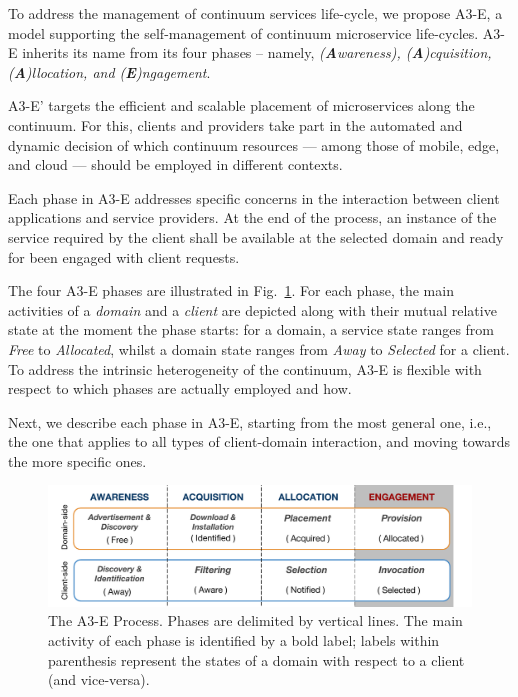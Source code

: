 To address the management of continuum services life-cycle, we propose A3-E, a model supporting the self-management of continuum microservice life-cycles. A3-E inherits its name from its four phases -- namely, \textit{(\textbf{A}wareness), (\textbf{A})cquisition, (\textbf{A})llocation, and (\textbf{E})ngagement}. 

A3-E' targets the efficient and scalable placement of microservices along the continuum. For this, clients and providers take part in the automated and dynamic decision of which continuum resources --- among those of mobile, edge, and cloud --- should be employed in different contexts.

Each phase in A3-E addresses specific concerns in the interaction between client applications and service providers. At the end of the process, an instance of the service required by the client shall be available at the selected domain and ready for been engaged with client requests. 

The four A3-E phases are illustrated in Fig.~\ref{fig:A3-E-process}. For each phase, the main activities of a \textit{domain} and a \textit{client} are depicted along with their mutual relative state at the moment the phase starts: for a domain, a service state ranges from \textit{Free} to \textit{Allocated}, whilst a domain state ranges from \textit{Away} to \textit{Selected} for a client. To address the intrinsic heterogeneity of the continuum, A3-E is flexible with respect to which phases are actually employed and how. 

Next, we describe each phase in A3-E, starting from the most general one, i.e., the one that applies to all types of client-domain interaction, and moving towards the more specific ones.

\begin{figure}[tbp]
	\includegraphics[width=1\textwidth]{figs/A3-E-process}
	\caption{The A3-E Process. Phases are delimited by vertical lines. The main activity of each phase is identified by a bold label; labels within parenthesis represent the states of a domain with respect to a client (and vice-versa).}
	\label{fig:A3-E-process}
\end{figure}

